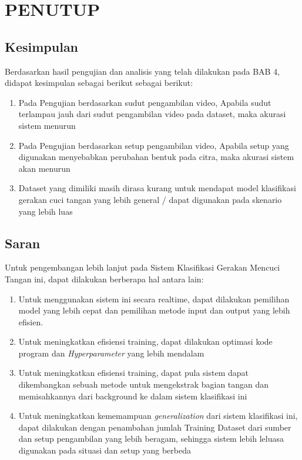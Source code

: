 \chapter{PENUTUP}
\label{chap:penutup}


\section{Kesimpulan}
\label{sec:kesimpulan}

Berdasarkan hasil pengujian dan analisis yang telah dilakukan pada BAB 4, didapat kesimpulan sebagai berikut sebagai berikut:

\begin{enumerate}[nolistsep]

  \item Pada Pengujian berdasarkan sudut pengambilan video, Apabila sudut terlampau jauh dari sudut pengambilan video pada dataset, maka akurasi sistem menurun

  \item Pada Pengujian berdasarkan setup pengambilan video, Apabila setup yang digunakan menyebabkan perubahan bentuk pada citra, maka akurasi sistem akan menurun

  \item Dataset yang dimiliki masih dirasa kurang untuk mendapat model klasifikasi gerakan cuci tangan yang lebih general / dapat digunakan pada skenario yang lebih luas

\end{enumerate}

\section{Saran}
\label{chap:saran}

Untuk pengembangan lebih lanjut pada Sistem Klasifikasi Gerakan Mencuci Tangan ini, dapat dilakukan berberapa hal antara lain:

\begin{enumerate}[nolistsep]

  \item Untuk menggunakan sistem ini secara realtime, dapat dilakukan pemilihan model yang lebih cepat dan pemilihan metode input dan output yang lebih efisien.
  
  \item Untuk meningkatkan efisiensi training, dapat dilakukan optimasi kode program dan \textit{Hyperparameter} yang lebih mendalam

  \item Untuk meningkatkan efisiensi training, dapat pula sistem dapat dikembangkan sebuah metode untuk mengekstrak bagian tangan dan memisahkannya dari background ke dalam sistem klasifikasi ini

  \item Untuk meningkatkan kememampuan \textit{generalization} dari sistem klasifikasi ini, dapat dilakukan dengan penambahan jumlah Training Dataset dari sumber dan setup pengambilan yang lebih beragam, sehingga sistem lebih leluasa digunakan pada situasi dan setup yang berbeda

\end{enumerate}
